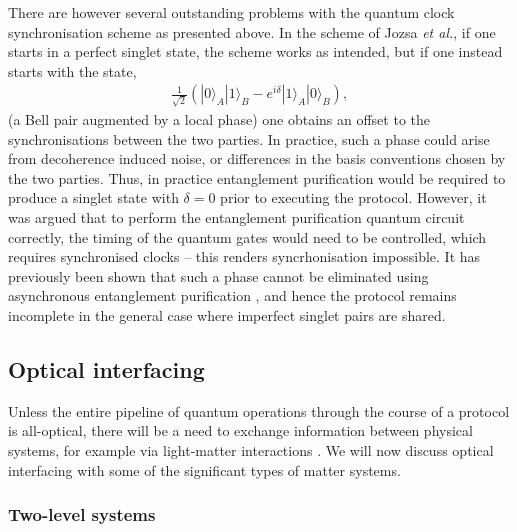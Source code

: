 There are however several outstanding problems with the quantum clock synchronisation scheme as presented above. In the scheme of Jozsa \textit{et al.}, if one starts in a perfect singlet state, the scheme works as intended, but if one instead starts with the state, 
\begin{align}
\frac{1}{\sqrt{2}} ( | 0 \rangle_A | 1 \rangle_B - e^{i \delta} | 1 \rangle_A | 0 \rangle_B ),
\end{align}
(a Bell pair augmented by a local phase) one obtains an offset to the synchronisations between the two parties. In practice, such a phase could arise from decoherence induced noise, or differences in the basis conventions chosen by the two parties. Thus, in practice entanglement purification would be required to produce a singlet state with \mbox{$\delta=0$} prior to executing the protocol. However, it was argued that to perform the entanglement purification quantum circuit correctly, the timing of the quantum gates would need to be controlled, which requires synchronised clocks \cite{bib:preskill2000quantum} --  this renders syncrhonisation impossible. It has previously been shown that such a phase cannot be eliminated using asynchronous entanglement purification \cite{bib:yurtsever02}, and hence the protocol remains incomplete in the general case where imperfect singlet pairs are shared. 

%
%

\subsection{Optical interfacing} \label{sec:opt_inter} 



Unless the entire pipeline of quantum operations through the course of a protocol is all-optical, there will be a need to exchange information between physical systems, for example via light-matter interactions \cite{bib:Cohen-Tannoudji92}. We will now discuss optical interfacing with some of the significant types of matter systems.

%
%

\subsubsection{Two-level systems} 

